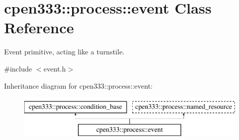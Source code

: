 \hypertarget{classcpen333_1_1process_1_1event}{}\section{cpen333\+:\+:process\+:\+:event Class Reference}
\label{classcpen333_1_1process_1_1event}


Event primitive, acting like a turnstile.  




{\ttfamily \#include $<$event.\+h$>$}

Inheritance diagram for cpen333\+:\+:process\+:\+:event\+:\begin{figure}[H]
\begin{center}
\leavevmode
\includegraphics[height=2.000000cm]{classcpen333_1_1process_1_1event}
\end{center}
\end{figure}
